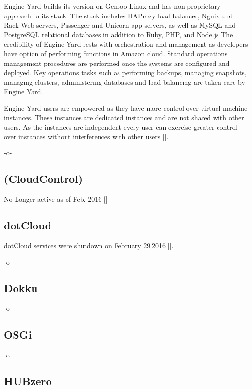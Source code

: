 Engine Yard builds its version on Gentoo Linux and has non-proprietary
approach to its stack. The stack includes HAProxy load balancer, Ngnix
and Rack Web servers, Passenger and Unicorn app servers, as well as
MySQL and PostgreSQL relational databases in addition to Ruby, PHP,
and Node.js The credibility of Engine Yard rests with orchestration
and management as developers have option of performing functions in
Amazon cloud. Standard operations management procedures are performed
once the systems are configured and deployed. Key operations tasks
such as performing backups, managing snapshots, managing clusters,
administering databases and load balancing are taken care by Engine
Yard.
    
Engine Yard users are empowered as they have more control over virtual
machine instances. These instances are dedicated instances and are not
shared with other users. As the instances are independent every user
can exercise greater control over instances without interferences with
other users [\cite{www-engineyard}].


-o-

\subsection{ (CloudControl)}

No Longer active as of Feb. 2016 [\cite{www-wiki}]

\subsection{dotCloud}

dotCloud services were shutdown on February
29,2016 [\cite{www-dotCloud}].

    -o-
    

\subsection{Dokku}

-o- 

\subsection{OSGi}

-o- 

\subsection{HUBzero}
     

